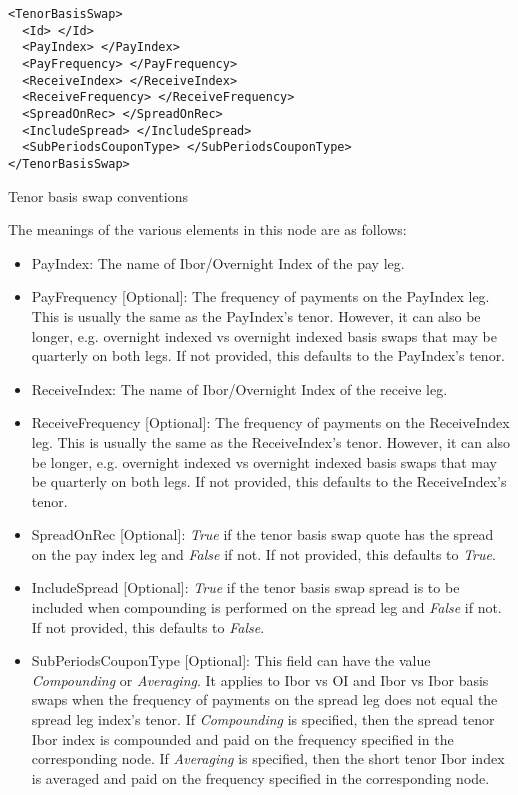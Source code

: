 \begin{listing}[H]
\begin{verbatim}
<TenorBasisSwap>
  <Id> </Id>
  <PayIndex> </PayIndex>
  <PayFrequency> </PayFrequency>
  <ReceiveIndex> </ReceiveIndex>
  <ReceiveFrequency> </ReceiveFrequency>
  <SpreadOnRec> </SpreadOnRec>
  <IncludeSpread> </IncludeSpread>
  <SubPeriodsCouponType> </SubPeriodsCouponType>
</TenorBasisSwap>
\end{verbatim}
\caption{Tenor basis swap conventions}
\label{lst:tenor_basis_conventions}
\end{listing}


The meanings of the various elements in this node are as follows:
\begin{itemize}
\item PayIndex: The name of Ibor/Overnight Index of the pay leg.
\item PayFrequency [Optional]: The frequency of payments on the PayIndex leg. This is usually the same as the PayIndex's tenor. 
However, it can also be longer, e.g. overnight indexed vs overnight indexed basis swaps that may be quarterly on both legs. 
If not provided, this defaults to the PayIndex's tenor.
\item ReceiveIndex: The name of Ibor/Overnight Index of the receive leg.
\item ReceiveFrequency [Optional]: The frequency of payments on the ReceiveIndex leg. This is usually the same as the ReceiveIndex's tenor. 
However, it can also be longer, e.g. overnight indexed vs overnight indexed basis swaps that may be quarterly on both legs. 
If not provided, this defaults to the ReceiveIndex's tenor.
\item SpreadOnRec [Optional]: \emph{True}  if the tenor basis swap quote has the spread on the pay index leg and \emph{False} if not. 
If not provided, this defaults to \emph{True}.
\item IncludeSpread [Optional]: \emph{True} if the tenor basis swap spread is to be included when compounding is performed on the spread leg and \emph{False} if not. 
If not provided, this defaults to \emph{False}.
\item SubPeriodsCouponType [Optional]: This field can have the value \emph{Compounding} or \emph{Averaging}. It applies to Ibor vs OI and Ibor vs Ibor basis swaps when the frequency of payments on the spread leg does not equal the spread leg index’s tenor. 
If \emph{Compounding} is specified, then the spread tenor Ibor index is compounded and paid on the frequency specified in the corresponding node. 
If \emph{Averaging} is specified, then the short tenor Ibor index is averaged and paid on the frequency specified in the corresponding node.
\end{itemize}

